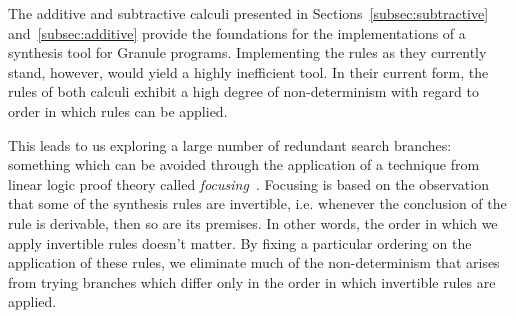 The additive and subtractive calculi presented in
Sections~\ref{subsec:subtractive} and~\ref{subsec:additive} provide the
foundations for the implementations of a synthesis tool for Granule programs.
Implementing the rules as they currently stand, however, would yield a highly
inefficient tool. In their current form, the rules of both calculi exhibit a
high degree of non-determinism with regard to order in which rules
can be applied. 


This leads to us exploring a large number of redundant search branches:
something which can be avoided through the application of a technique from
linear logic proof theory called \textit{focusing}~\citep{focusing}. Focusing is
based on the observation that some of the synthesis rules are invertible, i.e.
whenever the conclusion of the rule is derivable, then so are its premises. In
other words, the order in which we apply invertible rules doesn't matter. By
fixing a particular ordering on the application of these rules, we eliminate
much of the non-determinism that arises from trying branches which differ only
in the order in which invertible rules are applied. 

